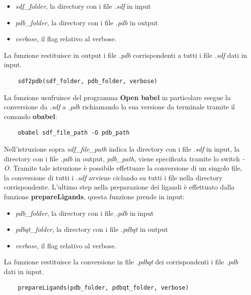 \begin{itemize}
    \item \textit{sdf\_folder}, la directory con i file \textit{.sdf} in input
    \item \textit{pdb\_folder}, la directory con i file \textit{.pdb} in output
    \item \textit{verbose}, il flag relativo al verbose.
\end{itemize}

La funzione restituisce in output i file \textit{.pdb} corrispondenti a tutti i file \textit{.sdf} dati in input.

\begin{verbatim}
    sdf2pdb(sdf_folder, pdb_folder, verbose)
\end{verbatim}

La funzione usufruisce del programma \textbf{Open babel} in particolare esegue la conversione da \textit{.sdf} a \textit{.pdb} richiamando la sua versione da terminale tramite il comando \textbf{obabel}:

\begin{verbatim}
    obabel sdf_file_path -O pdb_path
\end{verbatim}

Nell'istruzione sopra \textit{sdf\_file\_path} indica la directory con i file \textit{.sdf} in input, la directory con i file \textit{.pdb} in output, \textit{pdb\_path}, viene specificata tramite lo switch \textit{-O}. Tramite tale istruzione è possibile effettuare la conversione di un singolo file, la conversione di tutti i \textit{.sdf} avviene ciclando su tutti i file nella directory corrispondente.\newline
L'ultimo step nella preparazione dei ligandi è effettuato dalla funzione \textbf{prepareLigands}, questa funzione prende in input:

\begin{itemize}
    \item \textit{pdb\_folder}, la directory con i file \textit{.pdb} in input
    \item \textit{pdbqt\_folder}, la directory con i file \textit{.pdbqt} in output
    \item \textit{verbose}, il flag relativo al verbose.
\end{itemize}

La funzione restituisce la conversione in file \textit{.pdbqt} dei corrispondenti i file \textit{.pdb} dati in input.

\begin{verbatim}
    prepareLigands(pdb_folder, pdbqt_folder, verbose)
\end{verbatim}

